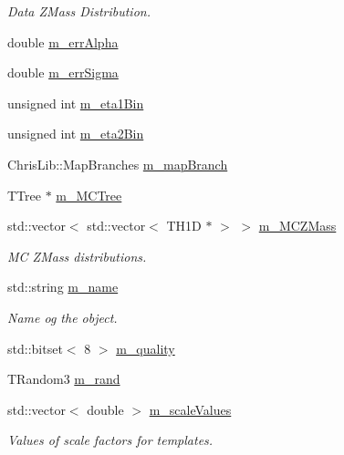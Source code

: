 \begin{DoxyCompactItemize}
\begin{DoxyCompactList}\small\item\em Data Z\+Mass Distribution. \end{DoxyCompactList}\item 
double \hyperlink{classTemplateMethod_1_1ChiMatrix_a47caa35fb6107e3f421fa2fbfd0520ca}{m\+\_\+err\+Alpha}
\item 
double \hyperlink{classTemplateMethod_1_1ChiMatrix_a9c42af04873aa3376a16539e7f4c2208}{m\+\_\+err\+Sigma}
\item 
unsigned int \hyperlink{classTemplateMethod_1_1ChiMatrix_a71cd8f60b444898cf9b64848b6749072}{m\+\_\+eta1\+Bin}
\item 
unsigned int \hyperlink{classTemplateMethod_1_1ChiMatrix_ade6254c49f2a87568a0a302ae9bc3134}{m\+\_\+eta2\+Bin}
\item 
Chris\+Lib\+::\+Map\+Branches \hyperlink{classTemplateMethod_1_1ChiMatrix_abc45359b905b85bde276eb2f8b119b94}{m\+\_\+map\+Branch}
\item 
T\+Tree $\ast$ \hyperlink{classTemplateMethod_1_1ChiMatrix_a4d9e75b858a413c383214431350e2432}{m\+\_\+\+M\+C\+Tree}
\item 
std\+::vector$<$ std\+::vector$<$ T\+H1\+D $\ast$ $>$ $>$ \hyperlink{classTemplateMethod_1_1ChiMatrix_ae2c14f2076f3d83ca2f880ea91299f7f}{m\+\_\+\+M\+C\+Z\+Mass}
\begin{DoxyCompactList}\small\item\em M\+C Z\+Mass distributions. \end{DoxyCompactList}\item 
std\+::string \hyperlink{classTemplateMethod_1_1ChiMatrix_adb41893ba19e889e56c559f25fc1a68a}{m\+\_\+name}
\begin{DoxyCompactList}\small\item\em Name og the object. \end{DoxyCompactList}\item 
std\+::bitset$<$ 8 $>$ \hyperlink{classTemplateMethod_1_1ChiMatrix_abe1a953be03b8ed2e7639c4d7be51210}{m\+\_\+quality}
\item 
T\+Random3 \hyperlink{classTemplateMethod_1_1ChiMatrix_a163ee2f68cb0c91fc7d6923b33028183}{m\+\_\+rand}
\item 
std\+::vector$<$ double $>$ \hyperlink{classTemplateMethod_1_1ChiMatrix_a22a7e8747d1d3b1ba2788ead0f173eb0}{m\+\_\+scale\+Values}
\begin{DoxyCompactList}\small\item\em Values of scale factors for templates. \end{DoxyCompactList}\item 

\end{DoxyCompactItemize}

